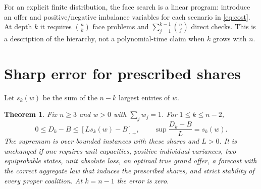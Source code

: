 \documentclass[11pt,a4paper]{article}
\newtheorem{theorem}{Theorem}
\theoremstyle{remark}
\newcommand{\pos}[1]{\left[#1\right]_+}
\begin{document}
For an explicit finite distribution, the face search is a linear program:
introduce an offer and positive/negative imbalance variables for each
scenario in \eqref{eq:cost}. At depth $k$ it requires $\binom nk$
face problems and $\sum_{j=1}^{k-1}\binom nj$ direct checks. This is a
description of the hierarchy, not a polynomial-time claim when $k$ grows
with $n$.

\section{Sharp error for prescribed shares}\label{sec:sharp}

Let $s_k(w)$ be the sum of the $n-k$ largest entries of $w$.

\begin{theorem}\label{thm:sharp}
Fix $n\ge3$ and $w>0$ with $\sum_jw_j=1$. For $1\le k\le n-2$,
\begin{equation}\label{eq:sharp}
 0\le D_k-B\le\pos{Ls_k(w)-B},\qquad
 \sup\frac{D_k-B}{L}=s_k(w).
\end{equation}
The supremum is over bounded instances with these shares and $L>0$.
It is unchanged if one requires unit capacities, positive individual
variances, two equiprobable states, unit absolute loss, an optimal true
grand offer, a forecast with the correct aggregate law that induces the
prescribed shares, and strict stability of every proper coalition.
At $k=n-1$ the error is zero.
\end{theorem}
\end{document}
